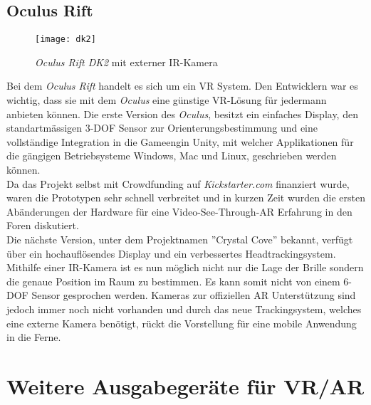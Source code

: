 \subsection*{Oculus Rift}
\begin{wrapfigure}{l}{0.5\textwidth}
	\vspace{-20pt}
	\begin{center}
		\texttt{[image: dk2]}
	\end{center}
	\vspace{-15pt}
	\captionsetup{width=0.42\textwidth}
	\caption{\textit{Oculus Rift DK2} mit externer IR-Kamera}\label{oculus}
	\vspace{-12pt}
\end{wrapfigure}
Bei dem \textit{Oculus Rift} handelt es sich um ein VR System. Den Entwicklern war es wichtig, dass sie mit dem \textit{Oculus} eine günstige VR-Lösung für jedermann anbieten können. Die erste Version des \textit{Oculus}, besitzt ein einfaches Display, den standartmässigen 3-DOF Sensor zur Orienterungsbestimmung und eine vollständige Integration in die Gameengin Unity, mit welcher Applikationen für die gängigen Betriebsysteme Windows, Mac und Linux, geschrieben werden können.\cite{website:oculus1}\\[6pt]
Da das Projekt selbst mit Crowdfunding auf \textit{Kickstarter.com} finanziert wurde\cite{website:ocukick}, waren die Prototypen sehr schnell verbreitet und in kurzen Zeit wurden die ersten Abänderungen der Hardware für eine Video-See-Through-AR Erfahrung in den Foren diskutiert.\cite{website:arrift}\\[6pt]
Die nächste Version, unter dem Projektnamen ''Crystal Cove'' bekannt, verfügt über ein hochauflösendes Display und ein verbessertes Headtrackingsystem. Mithilfe einer IR-Kamera ist es nun möglich nicht nur die Lage der Brille sondern die genaue Position im Raum zu bestimmen. Es kann somit nicht von einem 6-DOF Sensor gesprochen werden. Kameras zur offiziellen AR Unterstützung sind jedoch immer noch nicht vorhanden und durch das neue Trackingsystem, welches eine externe Kamera benötigt, rückt die Vorstellung für eine mobile Anwendung in die Ferne.\cite{website:oculus2}
\newpage
\section{Weitere Ausgabegeräte für VR/AR}\label{s.otherdevices}
